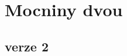 \documentclass{article}
\begin{document}
\section*{Mocniny dvou}

\subsection*{verze 2}

\end{document}
